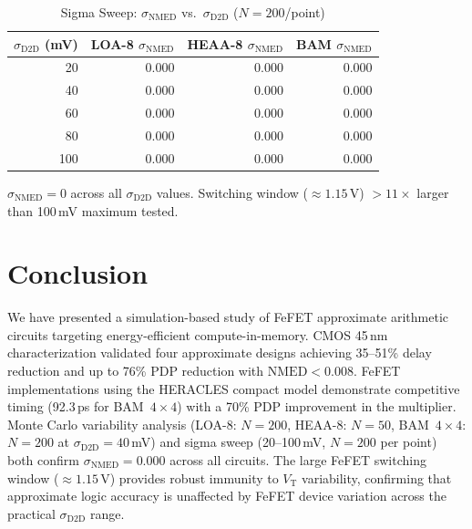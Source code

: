 \documentclass[letterpaper, 10 pt, conference]{ieeeconf}  %
\newcommand{\VT}{V_{\mathrm{T}}}
\newcommand{\NMED}{\mathrm{NMED}}
\newcommand{\sigDD}{\sigma_{\mathrm{D2D}}}
\newcommand{\sigNMED}{\sigma_{\mathrm{NMED}}}
\begin{document}
\begin{table}[t]
  \caption{Sigma Sweep: $\sigNMED$ vs.\ $\sigDD$ ($N = 200$/point)}
  \label{tab:sigma}
  \begin{center}
    \small
    \begin{tabular}{rrrr}
      \toprule
      $\sigDD$ (mV) & LOA-8 $\sigNMED$ & HEAA-8 $\sigNMED$ & BAM $\sigNMED$ \\
      \midrule
       20 & 0.000 & 0.000 & 0.000 \\
       40 & 0.000 & 0.000 & 0.000 \\
       60 & 0.000 & 0.000 & 0.000 \\
       80 & 0.000 & 0.000 & 0.000 \\
      100 & 0.000 & 0.000 & 0.000 \\
      \bottomrule
    \end{tabular}
  \end{center}
  \vspace{1pt}
  {\footnotesize $\sigNMED = 0$ across all $\sigDD$ values. Switching window
  ($\approx\!1.15$\,V) $>{11}\times$ larger than 100\,mV maximum tested.}
\end{table}


\addtolength{\textheight}{-4cm}   %


\section{Conclusion}

We have presented a simulation-based study of FeFET approximate arithmetic
circuits targeting energy-efficient compute-in-memory. CMOS 45\,nm
characterization validated four approximate designs achieving 35--51\% delay
reduction and up to 76\% PDP reduction with $\NMED < 0.008$. FeFET
implementations using the HERACLES compact model demonstrate competitive timing
(92.3\,ps for BAM~$4\times4$) with a 70\% PDP improvement in the multiplier.
Monte Carlo variability analysis (LOA-8: $N = 200$, HEAA-8: $N = 50$,
BAM~$4\times4$: $N = 200$ at $\sigDD = 40$\,mV) and sigma sweep
(20--100\,mV, $N = 200$ per point) both confirm $\sigNMED = 0.000$ across all
circuits. The large FeFET switching window ($\approx\!1.15$\,V) provides
robust immunity to $\VT$ variability, confirming that approximate logic
accuracy is unaffected by FeFET device variation across the practical $\sigDD$
range.


\end{document}
